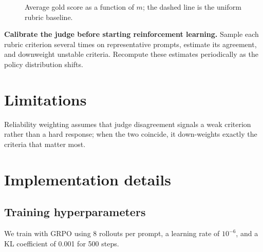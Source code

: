 \documentclass[palette=navy,titlestyle=rigorous,titlealign=center]{inkpaper}
\begin{document}
\begin{figure}[htb]
\centering
{}
\caption{ Average gold score as a function of
$m$; the dashed line is the uniform rubric baseline.}
\label{fig:ablation}
\end{figure}

\begin{practicalguidance}
\textbf{Calibrate the judge before starting reinforcement learning.} Sample
each rubric criterion several times on representative prompts, estimate its
agreement, and downweight unstable criteria. Recompute these estimates
periodically as the policy distribution shifts.
\end{practicalguidance}

\section{Limitations}
Reliability weighting assumes that judge disagreement signals a weak criterion
rather than a hard response; when the two coincide, it down-weights exactly
the criteria that matter most.




\beginappendix

\section{Implementation details}

\subsection{Training hyperparameters}
We train with GRPO using 8 rollouts per prompt, a learning rate of
$10^{-6}$, and a KL coefficient of 0.001 for 500 steps.
\end{document}

